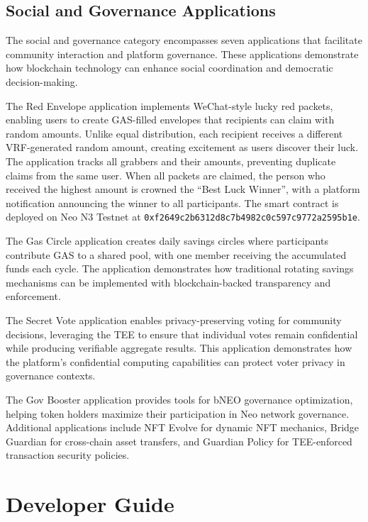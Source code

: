 \documentclass[11pt,a4paper]{article}
\begin{document}
\subsection{Social and Governance Applications}

The social and governance category encompasses seven applications that facilitate community interaction and platform governance. These applications demonstrate how blockchain technology can enhance social coordination and democratic decision-making.

The Red Envelope application implements WeChat-style lucky red packets, enabling users to create GAS-filled envelopes that recipients can claim with random amounts. Unlike equal distribution, each recipient receives a different VRF-generated random amount, creating excitement as users discover their luck. The application tracks all grabbers and their amounts, preventing duplicate claims from the same user. When all packets are claimed, the person who received the highest amount is crowned the ``Best Luck Winner'', with a platform notification announcing the winner to all participants. The smart contract is deployed on Neo N3 Testnet at \texttt{0xf2649c2b6312d8c7b4982c0c597c9772a2595b1e}.

The Gas Circle application creates daily savings circles where participants contribute GAS to a shared pool, with one member receiving the accumulated funds each cycle. The application demonstrates how traditional rotating savings mechanisms can be implemented with blockchain-backed transparency and enforcement.

The Secret Vote application enables privacy-preserving voting for community decisions, leveraging the TEE to ensure that individual votes remain confidential while producing verifiable aggregate results. This application demonstrates how the platform's confidential computing capabilities can protect voter privacy in governance contexts.

The Gov Booster application provides tools for bNEO governance optimization, helping token holders maximize their participation in Neo network governance. Additional applications include NFT Evolve for dynamic NFT mechanics, Bridge Guardian for cross-chain asset transfers, and Guardian Policy for TEE-enforced transaction security policies.

\newpage
\section{Developer Guide}
\end{document}
